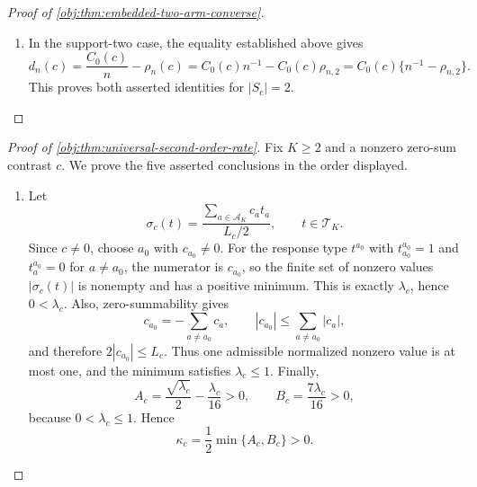 \begin{proof}[Proof of \cref{obj:thm:embedded-two-arm-converse}]
\begin{enumerate}
\item In the support-two case, the equality established above gives
\[
d_n(c)
=
\frac{C_0(c)}{n}-\rho_n(c)
=
C_0(c)n^{-1}-C_0(c)\rho_{n,2}
=
C_0(c)\{n^{-1}-\rho_{n,2}\}.
\]
This proves both asserted identities for \(|S_c|=2\).
\end{enumerate}
\end{proof}

\begin{proof}[Proof of \cref{obj:thm:universal-second-order-rate}]
Fix \(K\ge 2\) and a nonzero zero-sum contrast \(c\). We prove the five asserted conclusions in the order displayed.

\begin{enumerate}
\item Let
\[
\sigma_c(t)=\frac{\sum_{a\in\mathcal A_K}c_a t_a}{L_c/2},
\qquad t\in\mathcal T_K .
\]
Since \(c\neq 0\), choose \(a_0\) with \(c_{a_0}\neq 0\). For the response type \(t^{a_0}\) with \(t^{a_0}_{a_0}=1\) and \(t^{a_0}_a=0\) for \(a\neq a_0\), the numerator is \(c_{a_0}\), so the finite set of nonzero values \(|\sigma_c(t)|\) is nonempty and has a positive minimum. This is exactly \(\lambda_c\), hence \(0<\lambda_c\). Also, zero-summability gives
\[
c_{a_0}=-\sum_{a\neq a_0}c_a,
\qquad
|c_{a_0}|\le \sum_{a\neq a_0}|c_a|,
\]
and therefore \(2|c_{a_0}|\le L_c\). Thus one admissible normalized nonzero value is at most one, and the minimum satisfies \(\lambda_c\le 1\). Finally,
\[
A_c=\frac{\sqrt{\lambda_c}}2-\frac{\lambda_c}{16}>0,
\qquad
B_c=\frac{7\lambda_c}{16}>0,
\]
because \(0<\lambda_c\le 1\). Hence
\[
\kappa_c=\frac12\min\{A_c,B_c\}>0 .
\]


\end{enumerate}
\end{proof}

